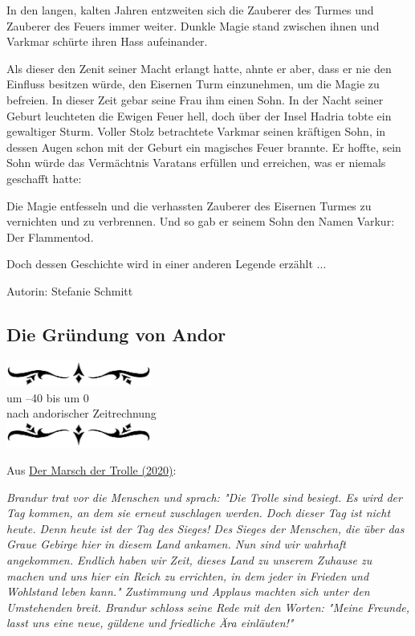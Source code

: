 \documentclass[10pt, a4paper, oneside]{book}
\newcommand{\reflegende}[1]{\hyperref[Legende: #1]{#1}}
\newcommand{\az}[1]{%
    \begin{center}
        \includegraphics[width=180px]{Chronik der Andorversen/verzierung1.png}\\
        {\Huge #1} \\
        {nach andorischer Zeitrechnung}\\
        \includegraphics[width=180px]{Chronik der Andorversen/verzierung2.png}
    \end{center}
    \extramarks{}{#1 a.Z.}
}
\begin{document}
\begin{multicols}{2}
In den langen, kalten Jahren entzweiten sich die Zauberer des Turmes und Zauberer des Feuers immer weiter. Dunkle Magie stand zwischen ihnen und Varkmar schürte ihren Hass aufeinander.\bigskip

Als dieser den Zenit seiner Macht erlangt hatte, ahnte er aber, dass er nie den Einfluss besitzen würde, den Eisernen Turm einzunehmen, um die Magie zu befreien. In dieser Zeit gebar seine Frau ihm einen Sohn. In der Nacht seiner Geburt leuchteten die Ewigen Feuer hell, doch über der Insel Hadria tobte ein gewaltiger Sturm. Voller Stolz betrachtete Varkmar seinen kräftigen Sohn, in dessen Augen schon mit der Geburt ein magisches Feuer brannte. Er hoffte, sein Sohn würde das Vermächtnis Varatans erfüllen und  erreichen, was er niemals geschafft hatte:\bigskip

Die Magie entfesseln und die verhassten Zauberer des Eisernen Turmes zu vernichten und zu verbrennen. Und so gab er seinem Sohn den Namen Varkur: Der Flammentod.\bigskip

Doch dessen Geschichte wird in einer anderen Legende erzählt ...\bigskip

Autorin: Stefanie Schmitt











\begin{chapterbox}
    \chapter{Die Gründung von Andor}


    \az{um –40 bis um 0}
    
    \begin{center}
        Aus \reflegende{Der Marsch der Trolle (2020)}:
    \end{center}
    
    \textit{Brandur trat vor die Menschen und sprach: "Die Trolle sind besiegt. Es wird der Tag kommen, an dem sie erneut zuschlagen werden. Doch dieser Tag ist nicht heute. Denn heute ist der Tag des Sieges! Des Sieges der Menschen, die über das Graue Gebirge hier in diesem Land ankamen. Nun sind wir wahrhaft angekommen. Endlich haben wir Zeit, dieses Land zu unserem Zuhause zu machen und uns hier ein Reich zu errichten, in dem jeder in Frieden und Wohlstand leben kann." Zustimmung und Applaus machten sich unter den Umstehenden breit. Brandur schloss seine Rede mit den Worten: "Meine Freunde, lasst uns eine neue, güldene und friedliche Ära einläuten!"}
    

\end{chapterbox}
\end{multicols}
\end{document}
